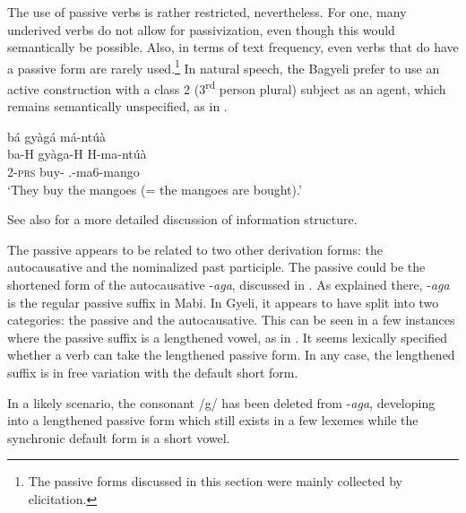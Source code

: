 The use of passive verbs is rather restricted, nevertheless. For one, many underived verbs do not allow for passivization, even though this would semantically be possible. Also, in terms of text frequency, even verbs that do have a passive form are rarely used.\footnote{The passive forms discussed in this section were mainly collected by elicitation.} In natural speech, the Bagyeli prefer to use an active construction with a class 2 (3\textsuperscript{rd} person plural) subject as an agent, which remains semantically unspecified, as in .

\ea \label{Passba}
 \glll bá gyàgá má-ntúà  \\
	ba-H gyàga-H H-ma-ntúà \\
         2-\textsc{prs} buy-{\R} {\OBJ}.{\LINK}-ma6-mango  \\
    \trans `They buy the mangoes (= the mangoes are bought).'
\z

\noindent See also  for a more detailed discussion of information structure.


The passive appears to be related to two other derivation forms: the autocausative and the nominalized past participle. The passive could be the shortened form of the autocausative -{\itshape aga}, discussed in . As explained there, -{\itshape aga} is the regular passive suffix in Mabi. In Gyeli, it appears to have split into two categories: the passive and the autocausative. This can be seen in a few instances where the passive suffix is a lengthened vowel, as in . It seems lexically specified whether a verb can take the lengthened passive form. In any case, the lengthened suffix is in free variation with the default short form.


\noindent In a likely scenario, the consonant /g/ has been deleted from -{\itshape aga}, developing into a lengthened passive form which still exists in a few lexemes while the synchronic default form is a short vowel.

